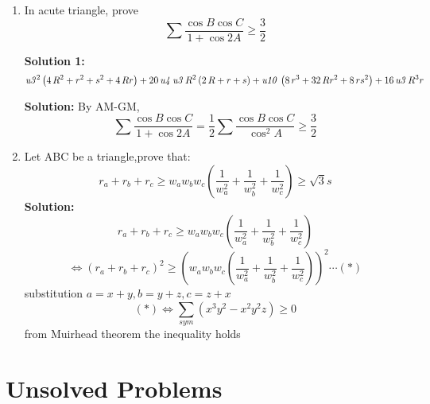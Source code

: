 \documentclass{report}
\begin{document}
\begin{enumerate}
	\item In acute triangle, prove\[\sum{\frac{\cos{B}\cos{C}}{1+\cos{2A}}}\geq \frac{3}{2}\]
	\begin{flushright}
	\end{flushright}
	\textbf{Solution 1:} $${{\it u3}}^{2} \left( 4\,{R}^{2}+{r}^{2}+{s}^{2}+4\,Rr \right) +20\,{\it u4}\,{\it u3}\,{R}^{2} \left( 2\,R+r+s \right) +{\it u10}\,\left( 8\,{r}^{3}+32\,R{r}^{2}+8\,r{s}^{2} \right) +16\,{\it u3}\,{R}^{3}r$$
	\begin{flushright}
	\end{flushright}
	\textbf{Solution:} By AM-GM,$$\sum{\frac{\cos B\cos C}{1+\cos2A}}=\frac{1}{2}\sum\frac{\cos B\cos C}{ \cos^2A}\geq \frac{3}{2}$$
	\begin{flushright}
	\end{flushright}
\item Let ABC be a triangle,prove that:$$ r_a + r_b + r_c\geq w_aw_bw_c(\frac {1}{w_a^2} + \frac {1}{w_b^2} + \frac {1}{w_c^2}) \geq \sqrt {3}s$$
\textbf{Solution:} $$ r_a + r_b + r_c\geq w_aw_bw_c\left( \frac {1}{w_a^2} + \frac {1}{w_b^2} + \frac {1}{w_c^2}\right) $$ $$\iff (r_a + r_b + r_c)^2\geq \left( w_aw_bw_c\left( \frac {1}{w_a^2} + \frac {1}{w_b^2} + \frac {1}{w_c^2}\right) \right) ^2\cdots(*)$$substitution $ a = x + y,b = y + z,c = z + x$ $$ (*)\iff\sum_{sym} \left( x^3y^2 - x^2y^2z\right) \geq 0$$from Muirhead theorem the inequality holds
	\begin{flushright}
\end{flushright}
\end{enumerate}

\section{Unsolved Problems}
\end{document}
